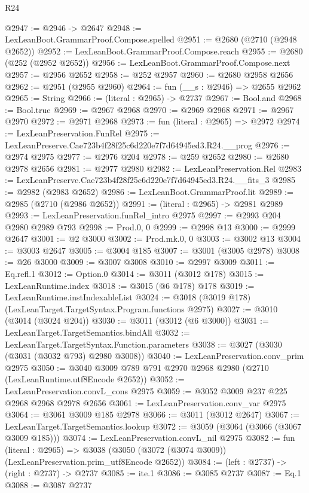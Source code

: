\begin{lexlean}{R24}
\begin{coremodule}
@2947 := @2946 -> @2647
@2948 := LexLeanBoot.GrammarProof.Compose.spelled
@2951 := @2680 (@2710 (@2948 @2652))
@2952 := LexLeanBoot.GrammarProof.Compose.reach
@2955 := @2680 (@252 (@2952 @2652))
@2956 := LexLeanBoot.GrammarProof.Compose.next
@2957 := @2956 @2652
@2958 := @252 @2957
@2960 := @2680 @2958 @2656
@2962 := @2951 (@2955 @2960)
@2964 := fun (__s : @2946) => @2655 @2962
@2965 := String
@2966 := (literal : @2965) -> @2737
@2967 := Bool.and
@2968 := Bool.true
@2969 := @2967 @2968
@2970 := @2969 @2968
@2971 := @2967 @2970
@2972 := @2971 @2968
@2973 := fun (literal : @2965) => @2972
@2974 := LexLeanPreservation.FunRel
@2975 := LexLeanPreserve.Cae723b4f28f25c6d220e7f7d64945ed3.R24.__prog
@2976 := @2974 @2975
@2977 := @2976 @204
@2978 := @259 @2652
@2980 := @2680 @2978 @2656
@2981 := @2977 @2980
@2982 := LexLeanPreservation.Rel
@2983 := LexLeanPreserve.Cae723b4f28f25c6d220e7f7d64945ed3.R24.__fits_3
@2985 := @2982 (@2983 @2652)
@2986 := LexLeanBoot.GrammarProof.lit
@2989 := @2985 (@2710 (@2986 @2652))
@2991 := (literal : @2965) -> @2981 @2989
@2993 := LexLeanPreservation.funRel_intro @2975
@2997 := @2993 @204 @2980 @2989 @793
@2998 := Prod.{0, 0}
@2999 := @2998 @13
@3000 := @2999 @2647
@3001 := @2 @3000
@3002 := Prod.mk.{0, 0}
@3003 := @3002 @13
@3004 := @3003 @2647
@3005 := @3004 @185
@3007 := @3001 (@3005 @2978)
@3008 := @26 @3000
@3009 := @3007 @3008
@3010 := @2997 @3009
@3011 := Eq.refl.{1}
@3012 := Option.{0}
@3014 := @3011 (@3012 @178)
@3015 := LexLeanRuntime.index
@3018 := @3015 (@6 @178) @178
@3019 := LexLeanRuntime.instIndexableList
@3024 := @3018 (@3019 @178) (LexLeanTarget.TargetSyntax.Program.functions @2975)
@3027 := @3010 (@3014 (@3024 @204))
@3030 := @3011 (@3012 (@6 @3000))
@3031 := LexLeanTarget.TargetSemantics.bindAll
@3032 := LexLeanTarget.TargetSyntax.Function.parameters
@3038 := @3027 (@3030 (@3031 (@3032 @793) @2980 @3008))
@3040 := LexLeanPreservation.conv_prim @2975
@3050 := @3040 @3009 @789 @791 @2970 @2968 @2980 (@2710 (LexLeanRuntime.utf8Encode @2652))
@3052 := LexLeanPreservation.convL_cons @2975
@3059 := @3052 @3009 @237 @225 @2968 @2968 @2978 @2656
@3061 := LexLeanPreservation.conv_var @2975
@3064 := @3061 @3009 @185 @2978
@3066 := @3011 (@3012 @2647)
@3067 := LexLeanTarget.TargetSemantics.lookup
@3072 := @3059 (@3064 (@3066 (@3067 @3009 @185)))
@3074 := LexLeanPreservation.convL_nil @2975
@3082 := fun (literal : @2965) =>
  @3038 (@3050 (@3072 (@3074 @3009)) (LexLeanPreservation.prim_utf8Encode @2652))
@3084 := (left : @2737) -> (right : @2737) -> @2737
@3085 := ite.{1}
@3086 := @3085 @2737
@3087 := Eq.{1}
@3088 := @3087 @2737

\end{coremodule}
\end{lexlean}
